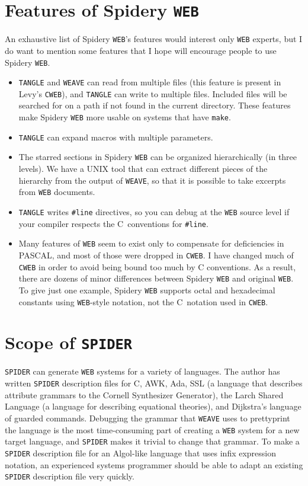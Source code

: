 \section{Features of Spidery {\tt WEB}}
An exhaustive list of Spidery {\tt WEB}'s features would interest only
{\tt WEB} experts, 
but I do want to mention some features that I hope will encourage
people to use Spidery {\tt WEB}.
\begin{itemize}
\item
{\tt TANGLE} and {\tt WEAVE} can read from multiple files (this
feature is present in Levy's {\tt CWEB}), and
{\tt TANGLE} can write to multiple files.
Included files will be searched for on a path if not found in the
current directory.
These features make Spidery {\tt WEB} more usable on systems that have
{\tt make}.
\item
{\tt TANGLE} can expand macros with multiple parameters.
\item
The starred sections in Spidery {\tt WEB} can be organized
hierarchically (in three levels).
We have a UNIX tool that can extract different pieces of the hierarchy
from the output of {\tt WEAVE}, so that it is possible to take
excerpts from {\tt WEB} documents.
\item
{\tt TANGLE} writes {\tt \#line} directives, so you can debug at the
{\tt WEB} source level if your compiler respects the C~conventions for
{\tt\#line}.
\item
Many features of {\tt WEB} seem to exist only to compensate for
deficiencies in PASCAL, and most of those were dropped in {\tt CWEB}.
I have changed much of {\tt CWEB} in order to avoid being bound too
much by C conventions.
As a result, there are dozens of minor differences between Spidery
{\tt WEB} and original {\tt WEB}.
To give just one example, Spidery {\tt WEB} supports
octal and hexadecimal constants using {\tt WEB}-style
notation, not the C~notation used in {\tt CWEB}.
\end{itemize}

\section{Scope of {\tt SPIDER}}
{\tt SPIDER} can generate {\tt WEB} systems for a variety
of languages.
The author has written {\tt SPIDER} description files for C, AWK, Ada,
SSL (a language that describes attribute grammars to the
Cornell Synthesizer Generator), 
the Larch Shared Language (a language for describing equational
theories), 
and Dijkstra's language of guarded commands.
Debugging the grammar that {\tt WEAVE} uses to
prettyprint the language is the most time-consuming part of creating a
{\tt WEB} system for a new target language,
and {\tt SPIDER} makes it trivial to change that grammar.
To make a {\tt SPIDER} description file for an Algol-like language
that uses infix expression notation, an experienced systems programmer
should be able to adapt an existing {\tt SPIDER} description file very
quickly.

